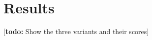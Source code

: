\documentclass{frontiersSCNS} %
\newcommand{\todo}[1]{
  \rule{0pt}{0pt}\marginpar{{\color{blue}\rule{1ex}{1ex}}}
  {[\textbf{\color{blue}todo:} #1]}}
\begin{document}

\section{Results}

\todo{Show the three variants and their scores}





\end{document}
